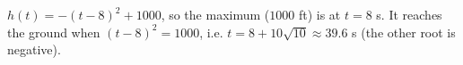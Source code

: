 $h(t)=-(t-8)^2+1000$, so the maximum ($1000$ ft) is at $t=\boxed{8}$ s. It reaches the ground when $(t-8)^2=1000$, i.e. $t=8+10\sqrt{10}\approx\boxed{39.6}$ s (the other root is negative).
